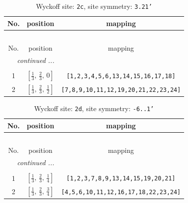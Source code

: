 \documentclass[fleqn,8pt]{jsarticle}
\begin{document}
\renewcommand{\arraystretch}{1.2}
\begin{longtable}{ccc}
\caption{Wyckoff site: {\tt 2c}, site symmetry: {\tt 3.21'}}
 \\
 \hline \hline
No. & position & mapping \\ \hline \endfirsthead

\multicolumn{2}{l}{\tablename\ \thetable{}} \\
 \hline \hline
No. & position & mapping \\ \hline \endhead

 \hline \hline
\multicolumn{2}{r}{\footnotesize\it continued ...} \\ \endfoot

 \hline \hline
\multicolumn{2}{r}{} \\ \endlastfoot

1 & $\left[ \frac{1}{3},\, \frac{2}{3},\, 0 \right]$ & {\tt [1,2,3,4,5,6,13,14,15,16,17,18]} \\ \hline
2 & $\left[ \frac{1}{3},\, \frac{2}{3},\, \frac{1}{2} \right]$ & {\tt [7,8,9,10,11,12,19,20,21,22,23,24]} \\
\end{longtable}
\renewcommand{\arraystretch}{1.2}
\begin{longtable}{ccc}
\caption{Wyckoff site: {\tt 2d}, site symmetry: {\tt -6..1'}}
 \\
 \hline \hline
No. & position & mapping \\ \hline \endfirsthead

\multicolumn{2}{l}{\tablename\ \thetable{}} \\
 \hline \hline
No. & position & mapping \\ \hline \endhead

 \hline \hline
\multicolumn{2}{r}{\footnotesize\it continued ...} \\ \endfoot

 \hline \hline
\multicolumn{2}{r}{} \\ \endlastfoot

1 & $\left[ \frac{1}{3},\, \frac{2}{3},\, \frac{1}{4} \right]$ & {\tt [1,2,3,7,8,9,13,14,15,19,20,21]} \\ \hline
2 & $\left[ \frac{1}{3},\, \frac{2}{3},\, \frac{3}{4} \right]$ & {\tt [4,5,6,10,11,12,16,17,18,22,23,24]} \\
\end{longtable}
\renewcommand{\arraystretch}{1.2}
\end{document}
